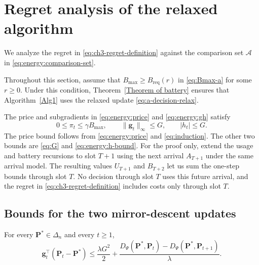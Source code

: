 \section{Regret analysis of the relaxed algorithm}
\label{regert sec}

We analyze the regret in \eqref{eq:ch3-regret-definition} against the
comparison set $\mathcal A$ in \eqref{eq:energy:comparison-set}.

Throughout this section, assume that $B_{\mathrm{max}}\geq B_{\mathrm{req}}(r)$
in \eqref{eq:Bmax-a} for some $r\geq0$. Under this condition,
Theorem~\ref{Theorem of battery} ensures that Algorithm~\ref{Alg1} uses
the relaxed update \eqref{eq:a-decision-relax}.

The price and subgradients in
\eqref{eq:energy:price} and \eqref{eq:energy:gh} satisfy
\begin{equation}
\label{eq:ch3-shifted-battery}
  0\leq\pi_t\leq\gamma B_{\mathrm{max}},\qquad
  \|\mathbf{g}_t\|_\infty\leq G,\qquad |h_t|\leq G.
\end{equation}
The price bound follows from \eqref{eq:energy:price} and
\eqref{eq:induction}. The other two bounds are \eqref{eq:G} and
\eqref{eq:energy:h-bound}.
For the proof only, extend the usage and battery recursions to slot $T+1$
using the next arrival $A_{T+1}$ under the same arrival model. The resulting
values $U_{T+1}$ and $B_{T+2}$ let us sum the one-step bounds through slot
$T$. No decision through slot $T$ uses this future arrival, and the regret
in \eqref{eq:ch3-regret-definition} includes costs only through slot $T$.

\subsection{Bounds for the two mirror-descent updates}

\begin{Thm:Lemma}
\label{lem:ch3-direction-bound}
For every $\mathbf{P}^*\in\Delta_n$ and every $t\geq1$,
\begin{equation}
\label{eq PArt1}
  \mathbf{g}_t^\top(\mathbf{P}_t-\mathbf{P}^*)
  \leq\frac{\lambda G^2}{2}
    +\frac{D_\Psi(\mathbf{P}^*,\mathbf{P}_t)-D_\Psi(\mathbf{P}^*,\mathbf{P}_{t+1})}{\lambda}.
\end{equation}
\end{Thm:Lemma}

